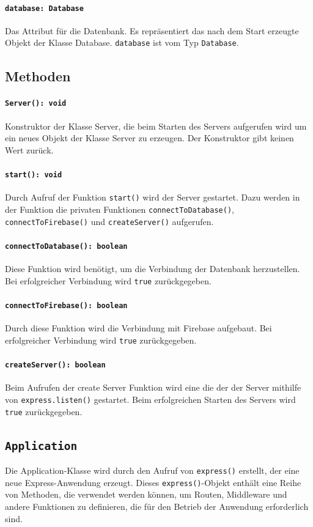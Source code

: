 \documentclass{entwurfsheft}
\begin{document}
\paragraph{\texttt{database: Database}}
Das Attribut für die Datenbank. Es repräsentiert das nach dem Start erzeugte Objekt der Klasse Database. \texttt{database} ist vom Typ \texttt{Database}.

\subsection*{Methoden}
\paragraph{\texttt{Server(): void}}
Konstruktor der Klasse Server, die beim Starten des Servers aufgerufen wird um ein neues Objekt der Klasse Server zu erzeugen. Der Konstruktor gibt keinen Wert zurück.
\paragraph{\texttt{start(): void}}
Durch Aufruf der Funktion \texttt{start()} wird der Server gestartet. Dazu werden in der Funktion die privaten Funktionen \texttt{connectToDatabase()}, \texttt{connectToFirebase()} und \texttt{createServer()} aufgerufen.
\paragraph{\texttt{connectToDatabase(): boolean}}
Diese Funktion wird benötigt, um die Verbindung der Datenbank herzustellen. Bei erfolgreicher Verbindung wird \texttt{true} zurückgegeben.
\paragraph{\texttt{connectToFirebase(): boolean}}
Durch diese Funktion wird die Verbindung mit Firebase aufgebaut. Bei erfolgreicher Verbindung wird \texttt{true} zurückgegeben.
\paragraph{\texttt{createServer(): boolean}}
Beim Aufrufen der create Server Funktion wird eine die der der Server mithilfe von \texttt{express.listen()} gestartet. Beim erfolgreichen Starten des Servers wird \texttt{true} zurückgegeben.

\newpage

\subsection{\texttt{Application}}\label{sec:Application}
Die Application-Klasse wird durch den Aufruf von \texttt{express()} erstellt, der eine neue Express-Anwendung erzeugt. Dieses \texttt{express()}-Objekt enthält eine Reihe von Methoden, die verwendet werden können, um Routen, Middleware und andere Funktionen zu definieren, die für den Betrieb der Anwendung erforderlich sind.
\end{document}
